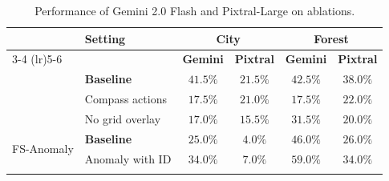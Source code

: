 \begin{table}[ht]
\centering
\footnotesize
\caption{Performance of Gemini 2.0 Flash and Pixtral-Large on ablations.}
\label{tab:ablations2}
\begin{tabular}{llcccc}
\toprule
& \multirow{2}{*}{\textbf{Setting}} & \multicolumn{2}{c}{\textbf{City}} & \multicolumn{2}{c}{\textbf{Forest}} \\
\cmidrule(lr){3-4} \cmidrule(lr){5-6}
&& \textbf{Gemini} & \textbf{Pixtral} & \textbf{Gemini} & \textbf{Pixtral} \\
\midrule
\multirow{3}{*}{\challenge{}} & \textbf{Baseline} & $\mathbf{41.5\%}$ & $\mathbf{21.5\%}$ & $\mathbf{42.5\%}$ & $\mathbf{38.0\%}$ \\
& Compass actions & $17.5\%$ & $21.0\%$ & $17.5\%$ & $22.0\%$ \\
& No grid overlay & $17.0\%$ & $15.5\%$ & $31.5\%$ & $20.0\%$ \\
\midrule
\multirow{2}{*}{FS-Anomaly} & \textbf{Baseline} & $25.0\%$ & $4.0\%$ & $46.0\%$ & $26.0\%$ \\
& Anomaly with ID & $\mathbf{34.0\%}$ & $\mathbf{7.0\%}$ & $\mathbf{59.0\%}$ & $\mathbf{34.0\%}$ \\
\bottomrule \\
\end{tabular}
\end{table}
